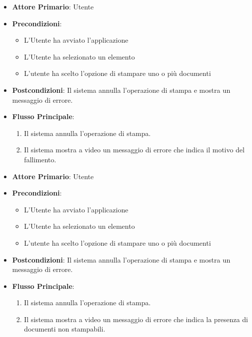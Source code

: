 \begin{itemize}
    \item \textbf{Attore Primario}: Utente
    \item \textbf{Precondizioni}: 
    \begin{itemize}
        \item L'Utente ha avviato l'applicazione
        \item L'Utente ha selezionato un elemento
        \item L'utente ha scelto l'opzione di stampare uno o più documenti
    \end{itemize}
    \item \textbf{Postcondizioni}: Il sistema annulla l'operazione di stampa e mostra un messaggio di errore.
    \item \textbf{Flusso Principale}:
    \begin{enumerate}
        \item Il sistema annulla l'operazione di stampa.
        \item Il sistema mostra a video un messaggio di errore che indica il motivo del fallimento.
    \end{enumerate}
\end{itemize}

\begin{itemize}
    \item \textbf{Attore Primario}: Utente
    \item \textbf{Precondizioni}: 
    \begin{itemize}
        \item L'Utente ha avviato l'applicazione
        \item L'Utente ha selezionato un elemento
        \item L'utente ha scelto l'opzione di stampare uno o più documenti
    \end{itemize}
    \item \textbf{Postcondizioni}: Il sistema annulla l'operazione di stampa e mostra un messaggio di errore.
    \item \textbf{Flusso Principale}:
    \begin{enumerate}
        \item Il sistema annulla l'operazione di stampa.
        \item Il sistema mostra a video un messaggio di errore che indica la presenza di documenti non stampabili.
    \end{enumerate}
\end{itemize}
